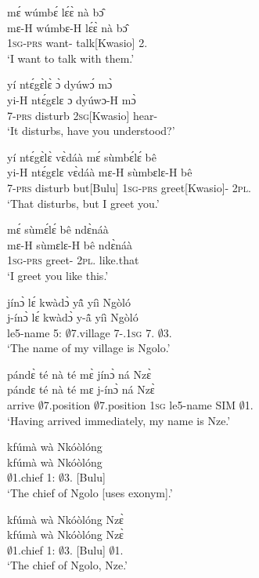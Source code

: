 \begin{exe}[(C234)] 
\exC\label{01}
  \glll     mɛ́ wúmbɛ́ lɛ́ɛ̀ nà bɔ̂\\
           mɛ-H wúmbɛ-H lɛ́ɛ̀ nà bɔ̂ \\
              1\textsc{sg}-\textsc{prs} want-{\R} talk[Kwasio] {\COM} 2.{\OBJ}   \\
    \trans `I want to talk with them.'
 
\exC\label{02}
  \glll     yí ntɛ́gɛ̀lɛ̀ ɔ̀ dyúwɔ́ mɔ̀ \\
            yi-H ntɛ́gɛlɛ ɔ dyúwɔ-H mɔ̀ \\
             7-\textsc{prs} disturb  2\textsc{sg}[Kwasio] hear-{\R} {\COMPL}  \\
    \trans `It disturbs, have you understood?'
 
\exC\label{03}
  \glll      yí ntɛ́gɛ̀lɛ̀ vɛ̀dáà mɛ́ sùmbɛ́lɛ́ bê \\
           yi-H ntɛ́gɛlɛ vɛ̀dáà mɛ-H sùmbɛlɛ-H bê \\
              7-\textsc{prs} disturb but[Bulu] 1\textsc{sg}-\textsc{prs} greet[Kwasio]-{\R} 2\textsc{pl}.{\OBJ} \\
    \trans `That disturbs, but I greet you.'
 
\exC\label{04}
  \glll     mɛ́ sùmɛ́lɛ́ bê ndɛ̀náà \\
            mɛ-H sùmɛlɛ-H bê ndɛ̀náà \\
              1\textsc{sg}-\textsc{prs} greet-{\R} 2\textsc{pl}.{\OBJ} like.that   \\
    \trans `I greet you like this.'
 
\exC\label{05}
  \glll  jínɔ̀ lɛ́ kwàdɔ̀ yã̂ yíì Ngòló \\
         j-ínɔ̀ lɛ́ kwàdɔ̀ y-ã̂ yíì Ngòló \\
    le5-name 5:{\ATT}  $\emptyset$7.village 7-{\POSS}.1\textsc{sg} 7.{\COP} $\emptyset$3.{\PN}  \\
    \trans `The name of my village is Ngolo.'
 
\exC\label{06}
  \glll  pándɛ̀ té nà té mɛ̀ jínɔ̀ ná Nzɛ̀ \\
          pándɛ té nà té mɛ j-ínɔ̀ ná Nzɛ̀ \\
              arrive  $\emptyset$7.position {\CONJ} $\emptyset$7.position 1\textsc{sg} le5-name SIM $\emptyset$1.{\PN}   \\
    \trans `Having arrived immediately, my name is Nze.'
 
\exC\label{07}
  \glll     kfúmà wà Nkóòlóng \\
          kfúmà wà Nkóòlóng \\
              $\emptyset$1.chief 1:{\ATT}  $\emptyset$3.{\PN} [Bulu] \\
    \trans `The chief of Ngolo [uses exonym].'
 
\exC\label{08}
  \glll     kfúmà wà Nkóòlóng Nzɛ̀ \\
           kfúmà wà Nkóòlóng Nzɛ̀ \\
              $\emptyset$1.chief 1:{\ATT}  $\emptyset$3.{\PN} [Bulu] $\emptyset$1.{\PN} \\
    \trans `The chief of Ngolo, Nze.'
\end{exe}

